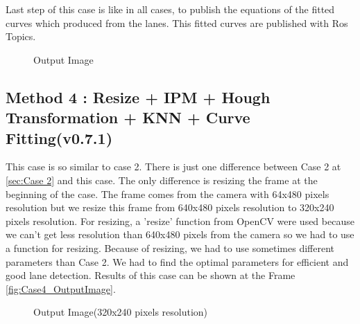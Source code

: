 Last step of this case is like in all cases, to publish the equations of the fitted curves which produced from the lanes. This fitted curves are published with Ros Topics.

\begin{figure}[H]
  \centering
  \caption{Output Image}
\end{figure}

\subsection{Method 4 : Resize + IPM + Hough Transformation + KNN + Curve Fitting(v0.7.1)}\label{sec:Case 4}

This case is so similar to case 2. There is just one difference between Case 2 at \ref{sec:Case 2} and this case. The only difference is resizing the frame at the beginning of the case. The frame comes from the camera with 64x480 pixels resolution but we resize this frame from 640x480 pixels resolution to 320x240 pixels resolution. For resizing, a 'resize' function from OpenCV were used because we can't get less resolution than 640x480 pixels from the camera so we had to use a function for resizing. Because of resizing, we had to use sometimes different parameters than Case 2. We had to find the optimal parameters for efficient and good lane detection. Results of this case can be shown at the Frame \ref{fig:Case4_OutputImage}.

\begin{figure}[H]
  \centering
  \caption{Output Image(320x240 pixels resolution)}
\end{figure}

%

